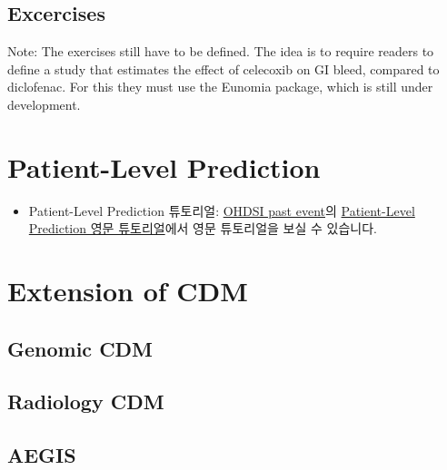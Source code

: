 \documentclass[]{book}
\providecommand{\tightlist}{%
  \setlength{\itemsep}{0pt}\setlength{\parskip}{0pt}}
\begin{document}
\hypertarget{excercises}{%
\section{Excercises}\label{excercises}}

Note: The exercises still have to be defined. The idea is to require readers to define a study that estimates the effect of celecoxib on GI bleed, compared to diclofenac. For this they must use the Eunomia package, which is still under development.

\hypertarget{patient-level-prediction}{%
\chapter{Patient-Level Prediction}\label{patient-level-prediction}}

\begin{itemize}
\tightlist
\item
  Patient-Level Prediction 튜토리얼: \href{https://www.ohdsi.org/past-events/}{OHDSI past event}의 \href{https://www.ohdsi.org/past-events/patient-level-prediction}{Patient-Level Prediction 영문 튜토리얼}에서 영문 튜토리얼을 보실 수 있습니다.
\end{itemize}

\hypertarget{extension-of-cdm}{%
\chapter{Extension of CDM}\label{extension-of-cdm}}

\hypertarget{genomic-cdm}{%
\section{Genomic CDM}\label{genomic-cdm}}

\hypertarget{radiology-cdm}{%
\section{Radiology CDM}\label{radiology-cdm}}

\hypertarget{aegis}{%
\section{AEGIS}\label{aegis}}


\end{document}
